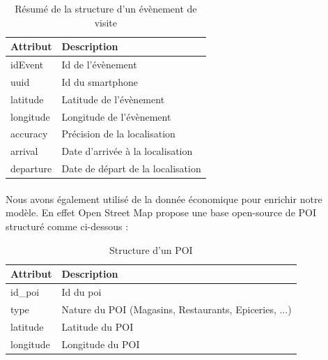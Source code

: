 \begin{table}[H]
    \centering
    \begin{tabular}{|l|l|}
    \hline
    \textbf{Attribut} & \textbf{Description}              \\ \hline
    idEvent           & Id de l'évènement                 \\ \hline
    uuid              & Id du smartphone                  \\ \hline
    latitude          & Latitude de l'évènement           \\ \hline
    longitude         & Longitude de l'évènement          \\ \hline
    accuracy          & Précision de la localisation      \\ \hline
    arrival           & Date d'arrivée à la localisation  \\ \hline
    departure         & Date de départ de la localisation \\ \hline
    \end{tabular}
    \caption{Résumé de la structure d'un évènement de visite}
\end{table}

\paragraph*{}

Nous avons également utilisé de la donnée économique pour enrichir notre modèle. En effet Open Street Map propose une base open-source de POI structuré comme ci-dessous :

\begin{table}[H]
    \centering
    \begin{tabular}{|l|l|}
    \hline
    \textbf{Attribut} & \textbf{Description}                                  \\ \hline
    id\_poi           & Id du poi                                             \\ \hline
    type              & Nature du POI (Magasins, Restaurants, Epiceries, ...) \\ \hline
    latitude          & Latitude du POI                                       \\ \hline
    longitude         & Longitude du POI                                      \\ \hline
    \end{tabular}
    \caption{Structure d'un POI}
\end{table}

